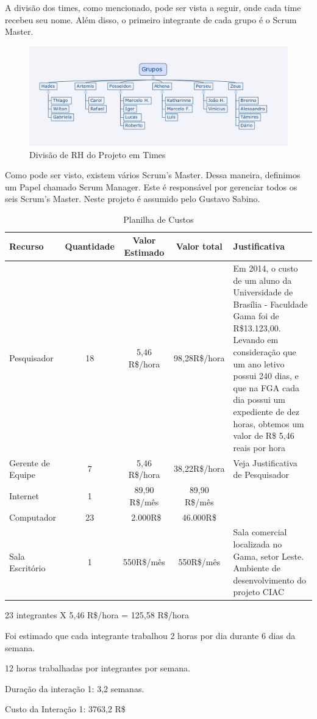 A divisão dos times, como mencionado, pode ser vista a seguir, onde cada time recebeu seu nome. Além disso,
o primeiro integrante de cada grupo é o Scrum Master.

\begin{figure}[h]
  \centering
  \includegraphics[width=450px, scale=0.5]{figuras/timeScrum}
  \caption{Divisão de RH do Projeto em Times}
  \label{table:timeScrum}
\end{figure}

Como pode ser visto, existem vários Scrum's Master. Dessa maneira, definimos um Papel
chamado Scrum Manager. Este é responsável por gerenciar todos os seis Scrum's Master.
Neste projeto é assumido pelo Gustavo Sabino.

\begin{table}[ht]
\caption{Planilha de Custos}
\centering
\begin{tabular}{|  p{2cm} |  c | c | c | p{5cm}|}
\hline
Recurso &
Quantidade  &
Valor Estimado &
Valor total &
Justificativa \\
\hline

Pesquisador &
18 &
5,46 R\$/hora &
98,28R\$/hora &
Em 2014, o custo de um aluno da Universidade de Brasília - Faculdade Gama foi de R\$13.123,00. Levando em
consideração que um ano letivo possui 240 dias, e que na FGA cada dia possui um expediente de dez horas,
obtemos um valor de R\$ 5,46 reais por hora \\

\hline

Gerente de Equipe &
7 &
5,46 R\$/hora &
38,22R\$/hora &
Veja Justificativa de Pesquisador \\

\hline

Internet  &
1 &
89,90 R\$/mês &
89,90 R\$/mês & \\
\hline

Computador &
23 &
~2.000R\$ &
46.000R\$ & \\

\hline

Sala Escritório &
1 &
550R\$/mês &
550R\$/mês &
Sala comercial localizada no Gama, setor Leste. Ambiente de desenvolvimento do projeto CIAC \\

\hline
\end{tabular}
\end{table}

23 integrantes X 5,46 R\$/hora = 125,58 R\$/hora


  Foi estimado que cada integrante trabalhou 2 horas por dia durante 6 dias da semana.

12 horas trabalhadas por integrantes por semana.

Duração da interação 1: 3,2 semanas.

Custo da Interação 1: 3763,2 R\$
